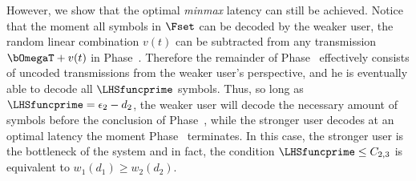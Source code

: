 However, we show that the optimal \emph{minmax} latency can still be achieved.  Notice that the moment all symbols in $\Fset$ can be decoded by the weaker user, the random linear combination $v(t)$ can be subtracted from any transmission $\bOmegaT + v(t)$ in Phase~.  Therefore the remainder of Phase~ effectively consists of uncoded transmissions from the weaker user's perspective, and he is eventually able to decode all $\LHSfuncprime$ symbols.  Thus, so long as $\LHSfuncprime = \epsilon_2 - d_2$, the weaker user will decode the necessary amount of symbols before the conclusion of Phase~, while the stronger user decodes at an optimal latency the moment Phase~ terminates.  In this case, the stronger user is the bottleneck of the system and in fact, the condition $\LHSfuncprime \leq C_{2, 3}$ is equivalent to $w_{1}(d_1) \geq w_2(d_2)$.  






